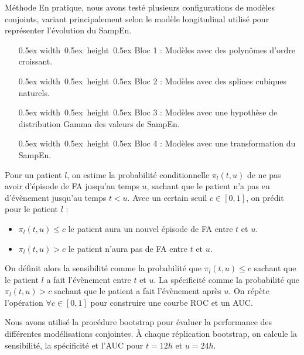 \documentclass[final]{beamer}
\newlength{\colwidth}
\begin{document}
\begin{frame}[t]
\begin{columns}[t]
\begin{column}{\colwidth}
\begin{block}{Méthode}
    En pratique, nous avons testé plusieurs configurations de modèles conjoints, variant principalement selon le modèle longitudinal utilisé
    pour représenter l'évolution du SampEn.
    \begin{itemize}
      \item[\textcolor{bloc1}{\raise0.5ex \hbox{\vrule width 0.5ex height 0.5ex}}] \textcolor{bloc1}{Bloc 1} : Modèles avec des polynômes d'ordre croissant.
      \item[\textcolor{bloc2}{\raise0.5ex \hbox{\vrule width 0.5ex height 0.5ex}}] \textcolor{bloc2}{Bloc 2} : Modèles avec des splines cubiques naturels.
      \item[\textcolor{bloc3}{\raise0.5ex \hbox{\vrule width 0.5ex height 0.5ex}}] \textcolor{bloc3}{Bloc 3} : Modèles avec une hypothèse de distribution Gamma des valeurs de SampEn.
      \item[\textcolor{bloc4}{\raise0.5ex \hbox{\vrule width 0.5ex height 0.5ex}}] \textcolor{bloc4}{Bloc 4} : Modèles avec une transformation du SampEn.
    \end{itemize}

      Pour un patient $l$, on estime la probabilité conditionnelle $\pi_l(t, u)$ \cite{andrinopoulou2021reflection} de ne pas avoir d'épisode de FA jusqu'au temps $u$, sachant que le patient n'a pas eu d'évènement jusqu'au temps $t<u$.
      Avec un certain seuil $c \in [0,1]$, on prédit pour le patient $l$ :
      \begin{itemize}
        \item $\pi_{l}(t, u) \leq c$ le patient aura un nouvel épisode de FA entre $t$ et $u$.
        \item $\pi_{l}(t, u) > c$ le patient n'aura pas de FA entre $t$ et $u$.
      \end{itemize}

      On définit alors la sensibilité comme la probabilité que $\pi_{l}(t, u) \leq c$ sachant que le patient $l$ a fait l'évènement entre $t$ et $u$.
      La spécificité comme la probabilité que $\pi_{l}(t, u) > c$ sachant que le patient a fait l'évènement après $u$. On répète l'opération $\forall c \in [0, 1]$ pour construire une courbe ROC et un AUC.

      Nous avons utilisé la procédure bootstrap pour évaluer la performance des différentes modélisations conjointes.
      À chaque réplication bootstrap, on calcule la sensibilité, la spécificité et l'AUC pour $t = 12h$ et $u = 24h$.
  \end{block}



\end{column}
\end{columns}
\end{frame}
\end{document}
